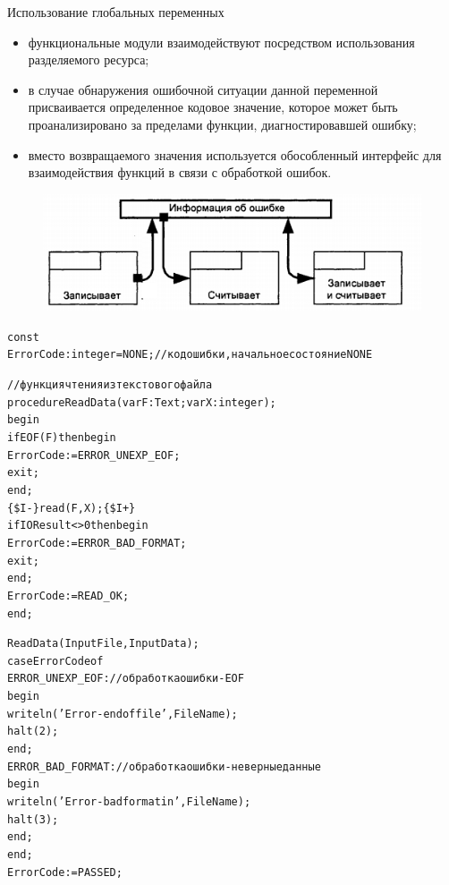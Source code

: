 \documentclass{beamer}
\begin{document}
\begin{frame}{Использование глобальных переменных}
\begin{itemize}
\item функциональные модули взаимодействуют посредством использования разделяемого ресурса;
\item в случае обнаружения ошибочной ситуации данной переменной присваивается определенное кодовое значение, которое может быть проанализировано за пределами функции, диагностировавшей ошибку;
\item вместо возвращаемого значения используется обособленный интерфейс для взаимодействия функций в связи с обработкой ошибок.
\end{itemize}
\begin{figure}[h]
\centering
\includegraphics[scale=0.5]{images/lec08-pic02.png}
\end{figure}
\end{frame}

\begin{frame}[fragile]
\begin{alltt}
const
  ErrorCode: integer = NONE;  //код ошибки, начальное состояние NONE

//функция чтения из текстового файла
procedure ReadData(var F: Text; var X: integer);
begin
  if EOF(F) then begin
    ErrorCode := ERROR_UNEXP_EOF;
    exit;
  end;
  \{\$I-\} read(F, X); \{\$I+\}
  if IOResult <> 0 then begin
    ErrorCode := ERROR_BAD_FORMAT;
    exit;
  end;
  ErrorCode := READ_OK;
end;
\end{alltt}
\end{frame}

\begin{frame}[fragile]
\begin{alltt}
  ReadData(InputFile, InputData);
  case ErrorCode of
    ERROR_UNEXP_EOF: //обработка ошибки - EOF
      begin
        writeln('Error  - end of file ', FileName);
        halt(2);
      end;
    ERROR_BAD_FORMAT: //обработка ошибки - неверные данные
      begin
        writeln('Error  - bad format in', FileName);
        halt(3);
      end;
  end;
  ErrorCode := PASSED; 
\end{alltt}
\end{frame}
\end{document}
